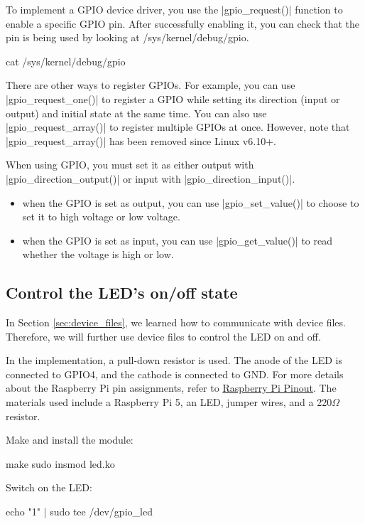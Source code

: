 \documentclass[10pt, oneside]{book}
\begin{document}
To implement a GPIO device driver, you use the \cpp|gpio_request()| function to enable a specific GPIO pin.
After successfully enabling it, you can check that the pin is being used by looking at /sys/kernel/debug/gpio.

\begin{codebash}
cat /sys/kernel/debug/gpio
\end{codebash}

There are other ways to register GPIOs.
For example, you can use \cpp|gpio_request_one()| to register a GPIO while setting its direction (input or output) and initial state at the same time.
You can also use \cpp|gpio_request_array()| to register multiple GPIOs at once. However, note that \cpp|gpio_request_array()| has been removed since Linux v6.10+.

When using GPIO, you must set it as either output with \cpp|gpio_direction_output()| or input with \cpp|gpio_direction_input()|.

\begin{itemize}
  \item when the GPIO is set as output, you can use \cpp|gpio_set_value()| to choose to set it to high voltage or low voltage.
  \item when the GPIO is set as input, you can use \cpp|gpio_get_value()| to read whether the voltage is high or low.
\end{itemize}

\subsection{Control the LED's on/off state}
\label{sec:gpio_led}
In Section \ref{sec:device_files}, we learned how to communicate with device files.
Therefore, we will further use device files to control the LED on and off.

In the implementation, a pull-down resistor is used.
The anode of the LED is connected to GPIO4, and the cathode is connected to GND.
For more details about the Raspberry Pi pin assignments, refer to \href{https://pinout.xyz/}{Raspberry Pi Pinout}.
The materials used include a Raspberry Pi 5, an LED, jumper wires, and a 220$\Omega$ resistor.


Make and install the module:
\begin{codebash}
make
sudo insmod led.ko
\end{codebash}

Switch on the LED:
\begin{codebash}
echo "1" | sudo tee /dev/gpio_led
\end{codebash}
\end{document}
